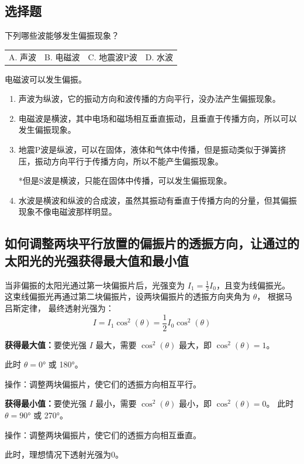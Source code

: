 \documentclass[]{../../templates/Report}%
\begin{document}
\begin{fullreportonly}
\subsection{选择题}
下列哪些波能够发生偏振现象？
\begin{table}[H]
\centering
\begin{tabular}{C{.2\textwidth}C{.2\textwidth}C{.2\textwidth}C{.2\textwidth}}
A. 声波 & B. 电磁波 & C. 地震波P波 & D. 水波
\end{tabular}
\end{table}
电磁波可以发生偏振。
\begin{enumerate}[label=\Alph*. , leftmargin = 6em]
    \item 声波为纵波，它的振动方向和波传播的方向平行，没办法产生偏振现象。
    \item 电磁波是横波，其中电场和磁场相互垂直振动，且垂直于传播方向，所以可以发生偏振现象。
    \item 地震P波是纵波，可以在固体，液体和气体中传播，但是振动类似于弹簧挤压，振动方向平行于传播方向，所以不能产生偏振现象。

    *但是S波是横波，只能在固体中传播，可以发生偏振现象。
    \item 水波是横波和纵波的合成波，虽然其振动有垂直于传播方向的分量，但其偏振现象不像电磁波那样明显。
\end{enumerate}
\subsection{如何调整两块平行放置的偏振片的透振方向，让通过的太阳光的光强获得最大值和最小值}
当非偏振的太阳光通过第一块偏振片后，光强变为 $I_1 = \frac{1}{2} I_0$，且变为线偏振光。
这束线偏振光再通过第二块偏振片，设两块偏振片的透振方向夹角为 $\theta$，
根据马吕斯定律，
最终透射光强为：
$$I = I_1 \cos^2(\theta) = \frac{1}{2} I_0 \cos^2(\theta)$$

\textbf{获得最大值：}要使光强 $I$ 最大，需要 $\cos^2(\theta)$ 最大，即 $\cos^2(\theta) = 1$。

此时 $\theta = \ang{0}$ 或 \ang{180}。

操作：调整两块偏振片，使它们的透振方向相互平行。

\textbf{获得最小值：}要使光强 $I$ 最小，需要 $\cos^2(\theta)$ 最小，即 $\cos^2(\theta) = 0$。
此时 $\theta = \ang{90}$ 或 \ang{270}。

操作：调整两块偏振片，使它们的透振方向相互垂直。

此时，理想情况下透射光强为0。
\end{fullreportonly}
\insertnotes
\end{document}
